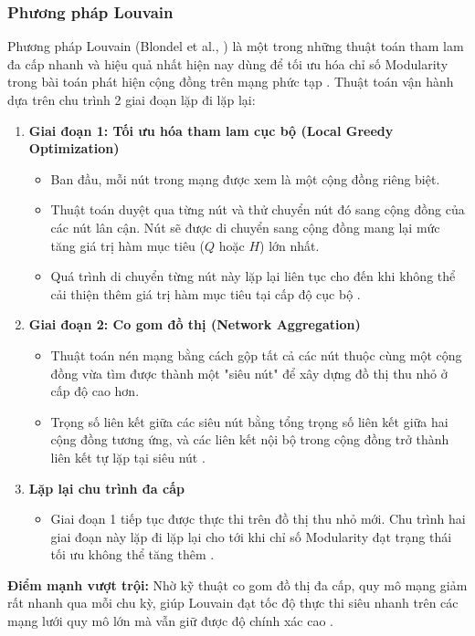 \documentclass[14pt,a4paper]{extarticle}
\begin{document}
\subsubsection{Phương pháp Louvain}
Phương pháp Louvain (Blondel et al., \cite{Blondel2008}) là một trong những thuật toán tham lam đa cấp nhanh và hiệu quả nhất hiện nay dùng để tối ưu hóa chỉ số Modularity trong bài toán phát hiện cộng đồng trên mạng phức tạp \cite{Traag2014}.
Thuật toán vận hành dựa trên chu trình 2 giai đoạn lặp đi lặp lại:
\begin{enumerate}
    \item \textbf{Giai đoạn 1: Tối ưu hóa tham lam cục bộ (Local Greedy Optimization)}
    \begin{itemize}
        \item Ban đầu, mỗi nút trong mạng được xem là một cộng đồng riêng biệt.
        \item Thuật toán duyệt qua từng nút và thử chuyển nút đó sang cộng đồng của các nút lân cận. Nút sẽ được di chuyển sang cộng đồng mang lại mức tăng giá trị hàm mục tiêu ($Q$ hoặc $H$) lớn nhất.
        \item Quá trình di chuyển từng nút này lặp lại liên tục cho đến khi không thể cải thiện thêm giá trị hàm mục tiêu tại cấp độ cục bộ \cite{Traag2014}.
    \end{itemize}
    \item \textbf{Giai đoạn 2: Co gom đồ thị (Network Aggregation)}
    \begin{itemize}
        \item Thuật toán nén mạng bằng cách gộp tất cả các nút thuộc cùng một cộng đồng vừa tìm được thành một "siêu nút" để xây dựng đồ thị thu nhỏ ở cấp độ cao hơn.
        \item Trọng số liên kết giữa các siêu nút bằng tổng trọng số liên kết giữa hai cộng đồng tương ứng, và các liên kết nội bộ trong cộng đồng trở thành liên kết tự lặp tại siêu nút \cite{Traag2014}.
    \end{itemize}
    \item \textbf{Lặp lại chu trình đa cấp}
    \begin{itemize}
        \item Giai đoạn 1 tiếp tục được thực thi trên đồ thị thu nhỏ mới. Chu trình hai giai đoạn này lặp đi lặp lại cho tới khi chỉ số Modularity đạt trạng thái tối ưu không thể tăng thêm \cite{Traag2014}.
    \end{itemize}
\end{enumerate}
\noindent \textbf{Điểm mạnh vượt trội:} Nhờ kỹ thuật co gom đồ thị đa cấp, quy mô mạng giảm rất nhanh qua mỗi chu kỳ, giúp Louvain đạt tốc độ thực thi siêu nhanh trên các mạng lưới quy mô lớn mà vẫn giữ được độ chính xác cao \cite{Traag2014}.
\end{document}
